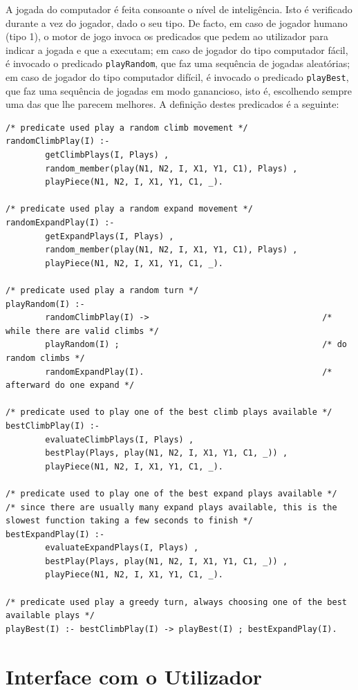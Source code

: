 \documentclass[a4paper]{article}
\begin{document}
A jogada do computador é feita consoante o nível de inteligência. Isto é verificado durante a vez do jogador, dado o seu tipo. De facto, em caso de jogador humano (tipo 1), o motor de jogo invoca os predicados que pedem ao utilizador para indicar a jogada e que a executam; em caso de jogador do tipo computador fácil, é invocado o predicado \verb|playRandom|, que faz uma sequência de jogadas aleatórias; em caso de jogador do tipo computador difícil, é invocado o predicado \verb|playBest|, que faz uma sequência de jogadas em modo ganancioso, isto é, escolhendo sempre uma das que lhe parecem melhores. A definição destes predicados é a seguinte:

\begin{lstlisting}
/* predicate used play a random climb movement */
randomClimbPlay(I) :- 
        getClimbPlays(I, Plays) , 
        random_member(play(N1, N2, I, X1, Y1, C1), Plays) , 
        playPiece(N1, N2, I, X1, Y1, C1, _).

/* predicate used play a random expand movement */
randomExpandPlay(I) :- 
        getExpandPlays(I, Plays) , 
        random_member(play(N1, N2, I, X1, Y1, C1), Plays) , 
        playPiece(N1, N2, I, X1, Y1, C1, _).

/* predicate used play a random turn */
playRandom(I) :- 
        randomClimbPlay(I) ->                                   /* while there are valid climbs */
        playRandom(I) ;                                         /* do random climbs */
        randomExpandPlay(I).                                    /* afterward do one expand */

/* predicate used to play one of the best climb plays available */
bestClimbPlay(I) :- 
        evaluateClimbPlays(I, Plays) , 
        bestPlay(Plays, play(N1, N2, I, X1, Y1, C1, _)) , 
        playPiece(N1, N2, I, X1, Y1, C1, _).

/* predicate used to play one of the best expand plays available */
/* since there are usually many expand plays available, this is the slowest function taking a few seconds to finish */
bestExpandPlay(I) :- 
        evaluateExpandPlays(I, Plays) , 
        bestPlay(Plays, play(N1, N2, I, X1, Y1, C1, _)) , 
        playPiece(N1, N2, I, X1, Y1, C1, _).

/* predicate used play a greedy turn, always choosing one of the best available plays */
playBest(I) :- bestClimbPlay(I) -> playBest(I) ; bestExpandPlay(I).
\end{lstlisting}

\section{Interface com o Utilizador}
\end{document}
